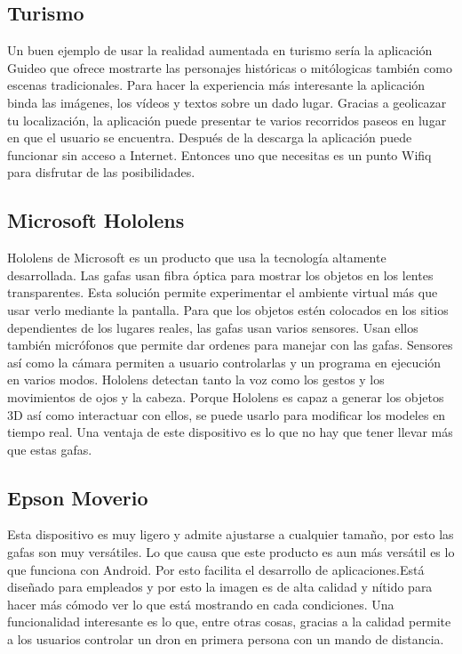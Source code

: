 \documentclass[a4paper,11pt]{scrartcl}
\begin{document}
\subsection{Turismo}
Un buen ejemplo de usar la realidad aumentada en turismo sería la aplicación Guideo\cite{guideo} que ofrece mostrarte las personajes históricas o mitólogicas también como escenas tradicionales. Para hacer la experiencia más interesante la aplicación binda las imágenes, los vídeos y textos sobre un dado lugar. Gracias a geolicazar tu localización, la aplicación puede presentar te varios recorridos paseos en lugar en que el usuario se encuentra. Después de la descarga la aplicación puede funcionar sin acceso a Internet. Entonces uno que necesitas es un punto Wifiq para disfrutar de las posibilidades.

\subsection{Microsoft Hololens}
Hololens de Microsoft\cite{hololens} es un producto que usa la tecnología altamente desarrollada. Las gafas usan fibra óptica para mostrar los objetos en los lentes transparentes.
Esta solución permite experimentar el ambiente virtual más que usar verlo mediante la pantalla.
Para que los objetos estén colocados en los sitios dependientes de los lugares reales, las gafas usan varios sensores. Usan ellos también micrófonos que permite dar ordenes para manejar con las gafas. Sensores así como la cámara permiten a usuario controlarlas y un programa en ejecución en varios modos. Hololens detectan tanto la voz como los gestos y los movimientos de ojos y la cabeza. Porque Hololens es capaz a generar los objetos 3D así como interactuar con ellos, se puede usarlo para modificar los modeles en tiempo real. Una ventaja de este dispositivo es lo que no hay que tener llevar más que estas gafas.


\subsection{Epson Moverio}
Esta dispositivo es muy ligero y admite ajustarse a cualquier tamaño, por esto las gafas son muy versátiles. Lo que causa que este producto es aun más versátil es lo que funciona con Android. Por esto facilita el desarrollo de aplicaciones.Está diseñado para empleados y por esto  la imagen es de alta calidad y nítido para hacer más cómodo ver lo que está mostrando en cada condiciones.
Una funcionalidad interesante es lo que, entre otras cosas, gracias a la calidad permite a los usuarios controlar un dron en primera persona con un mando de distancia.
\end{document}

